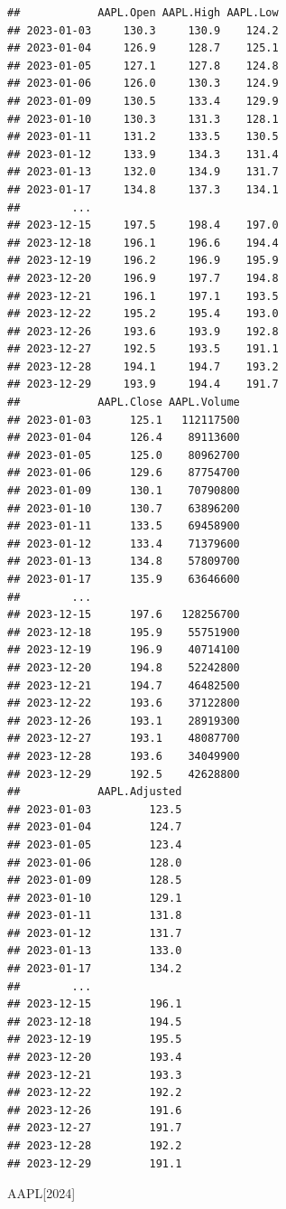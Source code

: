 \documentclass[]{ctexbook}
\newenvironment{Shaded}{\begin{snugshade}}{\end{snugshade}}
\newcommand{\NormalTok}[1]{#1}
\newcommand{\StringTok}[1]{\textcolor[rgb]{0.31,0.60,0.02}{#1}}
\begin{document}
\begin{verbatim}
##            AAPL.Open AAPL.High AAPL.Low
## 2023-01-03     130.3     130.9    124.2
## 2023-01-04     126.9     128.7    125.1
## 2023-01-05     127.1     127.8    124.8
## 2023-01-06     126.0     130.3    124.9
## 2023-01-09     130.5     133.4    129.9
## 2023-01-10     130.3     131.3    128.1
## 2023-01-11     131.2     133.5    130.5
## 2023-01-12     133.9     134.3    131.4
## 2023-01-13     132.0     134.9    131.7
## 2023-01-17     134.8     137.3    134.1
##        ...                             
## 2023-12-15     197.5     198.4    197.0
## 2023-12-18     196.1     196.6    194.4
## 2023-12-19     196.2     196.9    195.9
## 2023-12-20     196.9     197.7    194.8
## 2023-12-21     196.1     197.1    193.5
## 2023-12-22     195.2     195.4    193.0
## 2023-12-26     193.6     193.9    192.8
## 2023-12-27     192.5     193.5    191.1
## 2023-12-28     194.1     194.7    193.2
## 2023-12-29     193.9     194.4    191.7
##            AAPL.Close AAPL.Volume
## 2023-01-03      125.1   112117500
## 2023-01-04      126.4    89113600
## 2023-01-05      125.0    80962700
## 2023-01-06      129.6    87754700
## 2023-01-09      130.1    70790800
## 2023-01-10      130.7    63896200
## 2023-01-11      133.5    69458900
## 2023-01-12      133.4    71379600
## 2023-01-13      134.8    57809700
## 2023-01-17      135.9    63646600
##        ...                       
## 2023-12-15      197.6   128256700
## 2023-12-18      195.9    55751900
## 2023-12-19      196.9    40714100
## 2023-12-20      194.8    52242800
## 2023-12-21      194.7    46482500
## 2023-12-22      193.6    37122800
## 2023-12-26      193.1    28919300
## 2023-12-27      193.1    48087700
## 2023-12-28      193.6    34049900
## 2023-12-29      192.5    42628800
##            AAPL.Adjusted
## 2023-01-03         123.5
## 2023-01-04         124.7
## 2023-01-05         123.4
## 2023-01-06         128.0
## 2023-01-09         128.5
## 2023-01-10         129.1
## 2023-01-11         131.8
## 2023-01-12         131.7
## 2023-01-13         133.0
## 2023-01-17         134.2
##        ...              
## 2023-12-15         196.1
## 2023-12-18         194.5
## 2023-12-19         195.5
## 2023-12-20         193.4
## 2023-12-21         193.3
## 2023-12-22         192.2
## 2023-12-26         191.6
## 2023-12-27         191.7
## 2023-12-28         192.2
## 2023-12-29         191.1
\end{verbatim}

\begin{Shaded}
\begin{Highlighting}[]
\NormalTok{AAPL[}\StringTok{\textquotesingle{}2024\textquotesingle{}}\NormalTok{]}
\end{Highlighting}
\end{Shaded}
\end{document}
